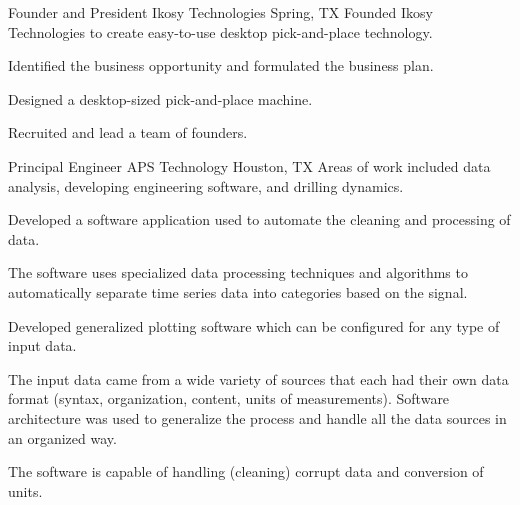 \documentclass{leresume}
\begin{document}
    
            {Founder and President}
            {Ikosy Technologies}
			{Spring, TX}
			Founded Ikosy Technologies to create easy-to-use desktop pick-and-place technology.
		\begin{bulletedlist}
			
		\item
		
					Identified the business opportunity and formulated the business plan.
				
		\item
		
					Designed a desktop-sized pick-and-place machine.
				
		\item
		
					Recruited and lead a team of founders.
				
		\end{bulletedlist}
	
            {Principal Engineer}
            {APS Technology}
			{Houston, TX}
			Areas of work included data analysis, developing engineering software, and drilling dynamics.\nolinebreak[4]
		\begin{bulletedlist}
			
		\item
		
					Developed a software application used to automate the cleaning and processing of data.
				
		\begin{bulletedlist}
			
		\item
		
						The software uses specialized data processing techniques and algorithms to automatically separate time series data into categories based on the signal.
					
		\end{bulletedlist}
	
		\item
		
					Developed generalized plotting software which can be configured for any type of input data.
				
		\begin{bulletedlist}
			
		\item
		
						The input data came from a wide variety of sources that each had their own data format (syntax, organization, content, units of measurements).  Software architecture
						was used to generalize the process and handle all the data sources in an organized way.
					
		\item
		
						The software is capable of handling (cleaning) corrupt data and conversion of units.
					
		\end{bulletedlist}
	
		\end{bulletedlist}
	
\end{document}
